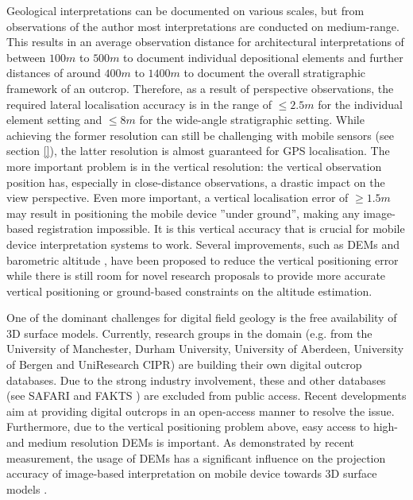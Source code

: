 \documentclass[review]{elsarticle}
\begin{document}
Geological interpretations can be documented on various scales, but from observations of the author most interpretations are conducted on medium-range. This results in an average observation distance for architectural interpretations of between $100m$ to $500m$ to document individual depositional elements and further distances of around $400m$ to $1400m$ to document the overall stratigraphic framework of an outcrop. Therefore, as a result of perspective observations, the required lateral localisation accuracy is in the range of $\leq 2.5m$ for the individual element setting and $\leq 8m$ for the wide-angle stratigraphic setting. While achieving the former resolution can still be challenging with mobile sensors (see section \ref{}), the latter resolution is almost guaranteed for GPS localisation. The more important problem is in the vertical resolution: the vertical observation position has, especially in close-distance observations, a drastic impact on the view perspective. Even more important, a vertical localisation error of  $\geq 1.5m$ may result in positioning the mobile device ''under ground'', making any image-based registration impossible. It is this vertical accuracy that is crucial for mobile device interpretation systems to work. Several improvements, such as \glspl{DEM} and barometric altitude \cite{Kehl2017_VGC}, have been proposed to reduce the vertical positioning error while there is still room for novel research proposals to provide more accurate vertical positioning or ground-based constraints on the altitude estimation.

One of the dominant challenges for digital field geology is the free availability of 3D surface models. Currently, research groups in the domain (e.g. from the University of Manchester, Durham University, University of Aberdeen, University of Bergen and UniResearch CIPR) are building their own digital outcrop databases. Due to the strong industry involvement, these and other databases (see SAFARI \cite{Dreyer1993} and FAKTS \cite{Colombera2012a}) are excluded from public access. Recent developments aim at providing digital outcrops in an open-access manner \cite{Cawood2018} to resolve the issue. Furthermore, due to the vertical positioning problem above, easy access to high- and medium resolution \glspl{DEM} is important. As demonstrated by recent measurement, the usage of \glspl{DEM} has a significant influence on the projection accuracy of image-based interpretation on mobile device towards 3D surface models \cite{Kehl2017_VGC}.
\end{document}
